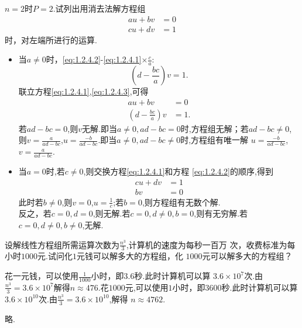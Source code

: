 ﻿\documentclass{book} \usepackage{exsheets} \usepackage{xeCJK}
\begin{document}
\begin{question}
$n=2$时$P=2$.试列出用消去法解方程组
\begin{align}
au+bv&=0  \label{eq:1.2.4.1}
  \tag{1}\\
cu+dv&=1\label{eq:1.2.4.2}\tag{2}
\end{align}
时，对左端所进行的运算.
\end{question}
\begin{solution}
\begin{itemize}
\item 当$a\neq 0$时，\eqref{eq:1.2.4.2}-\eqref{eq:1.2.4.1}$\times \frac{c}{a}$:
\begin{equation}
  \label{eq:1.2.4.3}
  \tag{3}
(d-\frac{bc}{a})v=1.
\end{equation}
联立方程\eqref{eq:1.2.4.1},\eqref{eq:1.2.4.3},可得
\begin{align*}
  au+bv&=0\\
 (d-\frac{bc}{a})v&=1.
\end{align*}
若$ad-bc=0$,则$v$无解.即当$a\neq 0,ad-bc=0$时,方程组无解；若$ad-bc\neq
0$,则$v=\frac{a}{ad-bc}$,$u=\frac{-b}{ad-bc}$.即当$a\neq
  0,ad-bc\neq 0$时,方程组有唯一解
  $u=\frac{-b}{ad-bc}$,$v=\frac{a}{ad-bc}$.
\item 当$a=0$时,若$c\neq 0$,则交换方程\eqref{eq:1.2.4.1}和方程
  \eqref{eq:1.2.4.2}的顺序,得到
  \begin{align*}
    cu+dv&=1\\
        bv&=0
  \end{align*}
此时若$b\neq 0$,则$v=0$,$u=\frac{1}{c}$;若$b=0$,则方程组有无数个解.\\

反之，若$c=0,d=0$,则无解.若$c=0,d\neq 0,b=0$,则有无穷解.若$c=0,d\neq
0,b\neq 0$,无解.
\end{itemize}
\end{solution}
\begin{question}
  设解线性方程组所需运算次数为$\frac{n^3}{3}$,计算机的速度为每秒一百万
  次，收费标准为每小时$1000$元.试问化$1$元钱可以解多大的方程组，化
  $1000$元可以解多大的方程组？
\end{question}
\begin{solution}
  花一元钱，可以使用$\frac{1}{1000}$小时，即$3.6$秒.此时计算机可以算
  $3.6\times 10^7$次.由$\frac{n^3}{3}=3.6\times 10^7$解得$n\approx
  476$.花$1000$元,可以使用$1$小时，即$3600$秒.此时计算机可以算
  $3.6\times 10^{10}$次.由$\frac{n^3}{3}=3.6\times 10^{10}$,解得
  $n\approx 4762$.
\end{solution}
\begin{question}
略.
\end{question}
\end{document}
